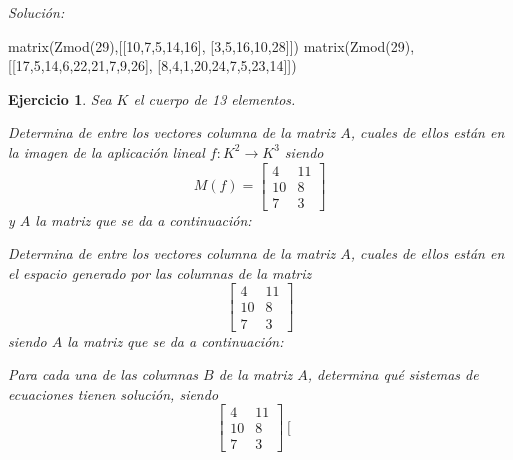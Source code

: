 \documentclass[12pt]{amsart}
\newtheorem{ejer}{Ejercicio}
\begin{document}
{\it Soluci\'on:}

\begin{sageblock}
matrix(Zmod(29),[[10,7,5,14,16],
[3,5,16,10,28]])
matrix(Zmod(29),[[17,5,14,6,22,21,7,9,26],
[8,4,1,20,24,7,5,23,14]])
\end{sageblock}



\begin{ejer} Sea $K$ el cuerpo de 13 elementos.
\newline
\noindent\begin{minipage}{\textwidth}
\begin{tcolorbox}[colback = green!20!white,title=Versión Núcleo]
Determina de entre los vectores columna de la matriz $A$, cuales de ellos están en la imagen de la aplicación lineal $f:K^{2} \to K^{3}$ siendo  $$ M(f) = \left[\begin{array}{rr}
4 & 11 \\
10 & 8 \\
7 & 3
\end{array}\right] $$ y $A$ la matriz que se da a continuación:\end{tcolorbox}
\end{minipage} \newline
\noindent\begin{minipage}{\textwidth}
\begin{tcolorbox}[colback = blue!20!white,title=Versión Anulador]
Determina de entre los vectores columna de la matriz $A$, cuales de ellos están en el espacio generado por las columnas de la matriz $$ \left[\begin{array}{rr}
4 & 11 \\
10 & 8 \\
7 & 3
\end{array}\right] $$ siendo $A$ la matriz que se da a continuación:\end{tcolorbox}
\end{minipage} \newline
\noindent\begin{minipage}{\textwidth} 
\begin{tcolorbox}[colback = red!20!white,title=Versión Ecuaciones Implícitas]
Para cada una de las columnas $B$ de la matriz $A$, determina qué sistemas de ecuaciones tienen solución, siendo $$ \left[\begin{array}{rr}
4 & 11 \\
10 & 8 \\
7 & 3
\end{array}\right] \left[\begin{array}{r}

\end{array}$$
\end{tcolorbox}
\end{minipage}
\end{ejer}
\end{document}
